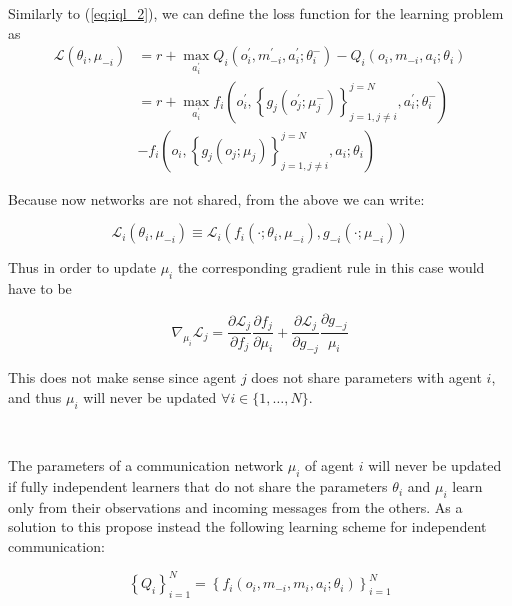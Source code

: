 \documentclass{article}
\begin{document}
Similarly to (\ref{eq:iql_2}), we can define the loss function for the learning problem as
\begin{equation}
\begin{aligned}
\mathcal{L}\left(\theta_i, \mu_{-i}\right) & =r+\max _{a_i^{\prime}} Q_i\left(o_i^{\prime}, m_{-i}^{\prime}, a_i^{\prime} ; \theta_i^{-}\right)-Q_i\left(o_i, m_{-i}, a_i ; \theta_i\right) \\
& =r+\max _{a_i^{\prime}} f_i\left(o_i^{\prime},\left\{g_j\left(o_j^{\prime} ; \mu_j^{-}\right)\right\}_{j=1, j \neq i}^{j=N}, a_i^{\prime} ; \theta_i^{-}\right) \\
& -f_i\left(o_i,\left\{g_j\left(o_j ; \mu_j\right)\right\}_{j=1, j \neq i}^{j=N}, a_i ; \theta_i\right)
\end{aligned}
\end{equation}

Because now networks are not shared, from the above we can write:

\begin{equation}
\mathcal{L}_i\left(\theta_i, \mu_{-i}\right) \equiv \mathcal{L}_i\left(f_i\left(\cdot ; \theta_i, \mu_{-i}\right), g_{-i}\left(\cdot ; \mu_{-i}\right)\right)
\end{equation}

Thus in order to update $\mu_i$ the corresponding gradient rule in this case would have to be

\begin{equation}
\nabla_{\mu_i} \mathcal{L}_j=\frac{\partial \mathcal{L}_j}{\partial f_j} \frac{\partial f_j}{\partial \mu_i}+\frac{\partial \mathcal{L}_j}{\partial g_{-j}} \frac{\partial g_{-j}}{\mu_i}
\end{equation}

This does not make sense since agent $j$ does not share parameters with agent $i$, and thus $\mu_i$ will never be updated $\forall i \in\{1, \ldots, N\}$.

\

The parameters of a communication network $\mu_i$ of agent $i$ will never be updated if fully independent learners that do not share the parameters $\theta_i$ and $\mu_i$ learn only from their observations and incoming messages from the others. As a solution to this \citet{pina2024fully} propose instead the following learning scheme for independent communication:

\begin{equation}\label{eq:q_iql_nps}
\left\{Q_i\right\}_{i=1}^N=\left\{f_i\left(o_i, m_{-i}, m_i, a_i ; \theta_i\right)\right\}_{i=1}^N
\end{equation}
\end{document}
